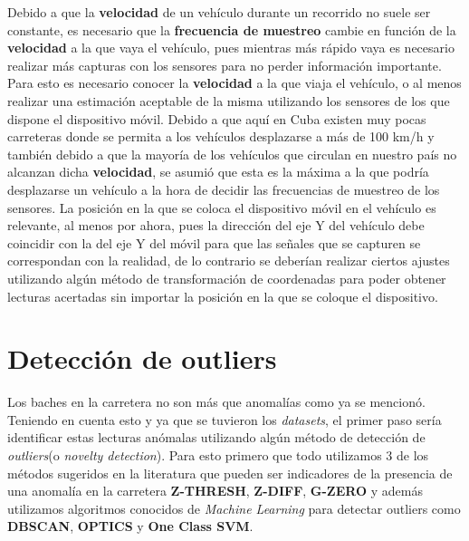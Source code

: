 	Debido a que la \textbf{velocidad} de un vehículo durante un recorrido no suele ser constante, es necesario
	que la \textbf{frecuencia de muestreo} cambie en función de la \textbf{velocidad} a la que vaya el vehículo,
	pues mientras más rápido vaya es necesario realizar más capturas con los sensores para no perder información
	importante. Para esto es necesario conocer la \textbf{velocidad} a la que viaja el vehículo, o al menos
	realizar una estimación aceptable de la misma utilizando los sensores de los que dispone el dispositivo móvil.
	Debido a que aquí en Cuba existen muy pocas carreteras donde se permita a los vehículos desplazarse a más de
	100 km/h y también debido a que la mayoría de los vehículos que circulan en nuestro país no alcanzan dicha
	\textbf{velocidad}, se asumió que esta es la máxima a la que podría desplazarse un vehículo a la hora de decidir
	las frecuencias de muestreo de los sensores. La posición en la que se coloca el dispositivo móvil en el vehículo
	es relevante, al menos por ahora, pues la dirección del eje Y del vehículo debe coincidir con la del eje Y del
	móvil para que las señales que se capturen se correspondan con la realidad, de lo contrario se deberían realizar
	ciertos ajustes utilizando algún método de transformación de coordenadas para poder obtener lecturas acertadas
	sin importar la posición en la que se coloque el dispositivo.

\section*{Detección de outliers}
	Los baches en la carretera no son más que anomalías como ya se mencionó. Teniendo en cuenta esto y ya que se tuvieron 
	los \emph{datasets}, el primer paso sería identificar estas lecturas anómalas utilizando algún método de detección de
	\emph{outliers}(o \emph{novelty detection}). Para esto primero que todo utilizamos 3 de los métodos sugeridos en la 
	literatura que pueden ser indicadores de la presencia de una anomalía en la carretera \textbf{Z-THRESH}, \textbf{Z-DIFF},
	\textbf{G-ZERO} y además utilizamos algoritmos conocidos de \emph{Machine Learning} para detectar outliers como \textbf{DBSCAN},
	\textbf{OPTICS} y \textbf{One Class SVM}.


